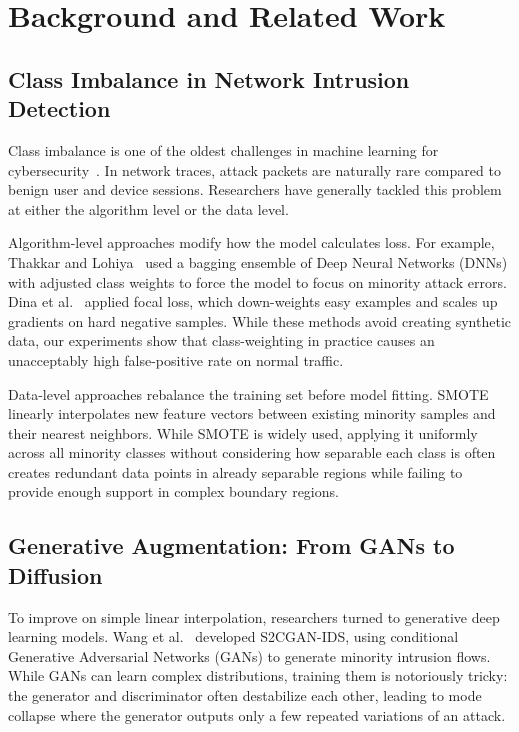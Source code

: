 \section{Background and Related Work}
\label{sec:related_work}

\subsection{Class Imbalance in Network Intrusion Detection}
Class imbalance is one of the oldest challenges in machine learning for cybersecurity~\cite{he2009learning}. In network traces, attack packets are naturally rare compared to benign user and device sessions. Researchers have generally tackled this problem at either the algorithm level or the data level.

Algorithm-level approaches modify how the model calculates loss. For example, Thakkar and Lohiya~\cite{thakkar2023attack} used a bagging ensemble of Deep Neural Networks (DNNs) with adjusted class weights to force the model to focus on minority attack errors. Dina et al.~\cite{dina2023deep} applied focal loss, which down-weights easy examples and scales up gradients on hard negative samples. While these methods avoid creating synthetic data, our experiments show that class-weighting in practice causes an unacceptably high false-positive rate on normal traffic.

Data-level approaches rebalance the training set before model fitting. SMOTE~\cite{chawla2002smote} linearly interpolates new feature vectors between existing minority samples and their nearest neighbors. While SMOTE is widely used, applying it uniformly across all minority classes without considering how separable each class is often creates redundant data points in already separable regions while failing to provide enough support in complex boundary regions.

\subsection{Generative Augmentation: From GANs to Diffusion}
To improve on simple linear interpolation, researchers turned to generative deep learning models. Wang et al.~\cite{wang2023lightweight} developed S2CGAN-IDS, using conditional Generative Adversarial Networks (GANs) to generate minority intrusion flows. While GANs can learn complex distributions, training them is notoriously tricky: the generator and discriminator often destabilize each other, leading to mode collapse where the generator outputs only a few repeated variations of an attack.

